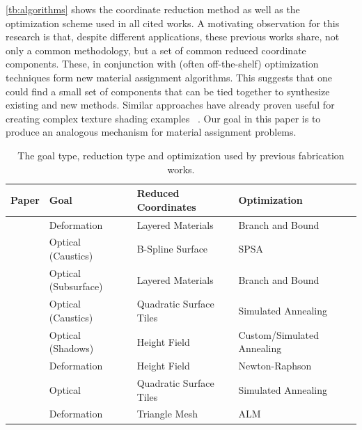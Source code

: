 \documentclass[annual]{acmsiggraph}
\begin{document}
\autoref{tb:algorithms} shows the coordinate reduction method as well as the optimization scheme used in all cited works. A motivating observation for this research is that, despite different applications, these previous works share, not only a common methodology, but a set of common reduced coordinate components. These, in conjunction with (often off-the-shelf) optimization techniques form new material assignment algorithms. This suggests that one could find a small set of components that can be tied together to synthesize existing and new methods. Similar approaches have already proven useful for creating complex texture shading examples ~\cite{Cook1984}. Our goal in this paper is to produce an analogous mechanism for material assignment problems. 
\begin{table}[htp]
\centering
\caption{The goal type, reduction type and optimization used by previous fabrication works.}
\begin{tabular}{clll}
\hline
\textbf{Paper} & \textbf{Goal} & \textbf{Reduced Coordinates}  & \textbf{Optimization} \\ 
\hline
~\cite{Bickel:2010}& Deformation & Layered Materials  & Branch and Bound \\
~\cite{Finckh:2010} & Optical (Caustics) & B-Spline Surface & SPSA \\
~\cite{Hasan:2010}& Optical (Subsurface) & Layered Materials & Branch and Bound\\ 
~\cite{Marios:2011} & Optical (Caustics) & Quadratic Surface Tiles & Simulated Annealing \\
~\cite{Bermano:2012} & Optical (Shadows) & Height Field & Custom/Simulated Annealing \\
~\cite{Bickel:2012} & Deformation &  Height Field &  Newton-Raphson \\
~\cite{Papas:2012} & Optical & Quadratic Surface Tiles & Simulated Annealing \\
~\cite{sko:2012}& Deformation & Triangle Mesh & ALM \\
\hline
\end{tabular}
\label{tb:algorithms}
\end{table}
\end{document}
